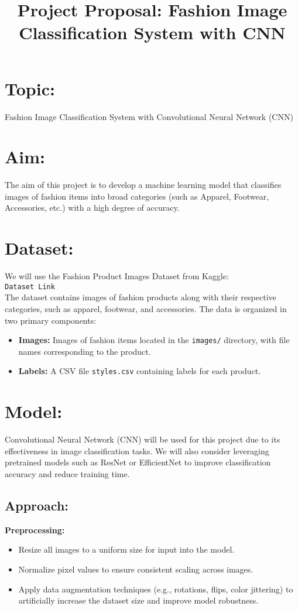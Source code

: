 \documentclass[12pt]{article}
\title{Project Proposal: Fashion Image Classification System with CNN}
\author{}
\date{}
\begin{document}
\maketitle

\section*{Topic:}
Fashion Image Classification System with Convolutional Neural Network (CNN)

\section*{Aim:}
The aim of this project is to develop a machine learning model that classifies images of fashion items into broad categories (such as Apparel, Footwear, Accessories, etc.) with a high degree of accuracy.

\section*{Dataset:}
We will use the Fashion Product Images Dataset from Kaggle: \\
\texttt{Dataset Link} \\
The dataset contains images of fashion products along with their respective categories, such as apparel, footwear, and accessories. The data is organized in two primary components:
\begin{itemize}
    \item \textbf{Images:} Images of fashion items located in the \texttt{images/} directory, with file names corresponding to the product.
    \item \textbf{Labels:} A CSV file \texttt{styles.csv} containing labels for each product.
\end{itemize}

\section*{Model:}
Convolutional Neural Network (CNN) will be used for this project due to its effectiveness in image classification tasks. We will also consider leveraging pretrained models such as ResNet or EfficientNet to improve classification accuracy and reduce training time.

\subsection*{Approach:}
\textbf{Preprocessing:}
\begin{itemize}
    \item Resize all images to a uniform size for input into the model.
    \item Normalize pixel values to ensure consistent scaling across images.
    \item Apply data augmentation techniques (e.g., rotations, flips, color jittering) to artificially increase the dataset size and improve model robustness.
\end{itemize}
\end{document}
